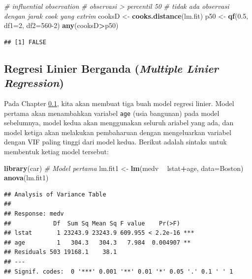 \documentclass[]{book}
\newenvironment{Shaded}{\begin{snugshade}}{\end{snugshade}}
\newcommand{\CommentTok}[1]{\textcolor[rgb]{0.56,0.35,0.01}{\textit{#1}}}
\newcommand{\DataTypeTok}[1]{\textcolor[rgb]{0.13,0.29,0.53}{#1}}
\newcommand{\DecValTok}[1]{\textcolor[rgb]{0.00,0.00,0.81}{#1}}
\newcommand{\FloatTok}[1]{\textcolor[rgb]{0.00,0.00,0.81}{#1}}
\newcommand{\KeywordTok}[1]{\textcolor[rgb]{0.13,0.29,0.53}{\textbf{#1}}}
\newcommand{\NormalTok}[1]{#1}
\newcommand{\OperatorTok}[1]{\textcolor[rgb]{0.81,0.36,0.00}{\textbf{#1}}}
\newcommand{\StringTok}[1]{\textcolor[rgb]{0.31,0.60,0.02}{#1}}
\theoremstyle{definition}
\theoremstyle{definition}
\theoremstyle{definition}
\theoremstyle{remark}
\begin{document}
\begin{Shaded}
\begin{Highlighting}[]
\CommentTok{# influential observation}
\CommentTok{# observasi > percentil 50}
\CommentTok{# tidak ada observasi dengan jarak cook yang extrim}
\NormalTok{cooksD <-}\StringTok{ }\KeywordTok{cooks.distance}\NormalTok{(lm.fit)}
\NormalTok{p50 <-}\StringTok{ }\KeywordTok{qf}\NormalTok{(}\FloatTok{0.5}\NormalTok{, }\DataTypeTok{df1=}\DecValTok{2}\NormalTok{, }\DataTypeTok{df2=}\DecValTok{560-2}\NormalTok{)}
\KeywordTok{any}\NormalTok{(cooksD}\OperatorTok{>}\NormalTok{p50)}
\end{Highlighting}
\end{Shaded}

\begin{verbatim}
## [1] FALSE
\end{verbatim}

\hypertarget{MLR}{%
\subsection{\texorpdfstring{Regresi Linier Berganda (\emph{Multiple Linier Regression})}{Regresi Linier Berganda (Multiple Linier Regression)}}\label{MLR}}

Pada Chapter \ref{MLR}, kita akan membuat tiga buah model regresi linier. Model pertama akan menambahkan variabel \texttt{age} (usia bangunan) pada model sebelumnya, model kedua akan menggunakan seluruh ariabel yang ada, dan model ketiga akan melakukan pembaharuan dengan mengeluarkan variabel dengan VIF paling tinggi dari model kedua. Berikut adalah sintaks untuk membentuk ketiag model tersebut:

\begin{Shaded}
\begin{Highlighting}[]
\KeywordTok{library}\NormalTok{(car)}
\CommentTok{# Model pertama}
\NormalTok{lm.fit1 <-}\StringTok{ }\KeywordTok{lm}\NormalTok{(medv }\OperatorTok{~}\StringTok{ }\NormalTok{lstat}\OperatorTok{+}\NormalTok{age, }\DataTypeTok{data=}\NormalTok{Boston)}
\KeywordTok{anova}\NormalTok{(lm.fit1)}
\end{Highlighting}
\end{Shaded}

\begin{verbatim}
## Analysis of Variance Table
## 
## Response: medv
##            Df  Sum Sq Mean Sq F value    Pr(>F)    
## lstat       1 23243.9 23243.9 609.955 < 2.2e-16 ***
## age         1   304.3   304.3   7.984  0.004907 ** 
## Residuals 503 19168.1    38.1                      
## ---
## Signif. codes:  0 '***' 0.001 '**' 0.01 '*' 0.05 '.' 0.1 ' ' 1
\end{verbatim}
\end{document}
